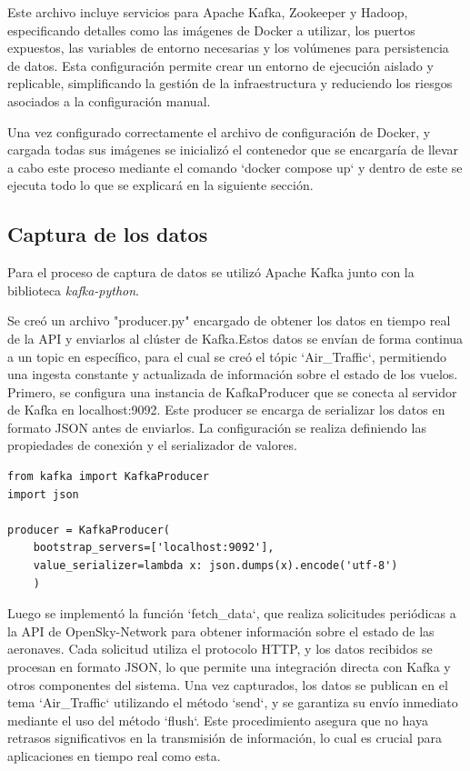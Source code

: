 \documentclass{article}
\begin{document}
Este archivo incluye servicios para Apache Kafka, Zookeeper y Hadoop, especificando detalles como las imágenes de Docker a utilizar, los puertos expuestos, las variables de entorno necesarias y los volúmenes para persistencia de datos. Esta configuración permite crear un entorno de ejecución aislado y replicable, simplificando la gestión de la infraestructura y reduciendo los riesgos asociados a la configuración manual.

Una vez configurado correctamente el archivo de configuración de Docker, y cargada todas sus imágenes se inicializó el contenedor que se encargaría de llevar a cabo este proceso mediante el comando `docker compose up` y dentro de este se ejecuta todo lo que se explicará en la siguiente sección.

\subsection{Captura de los datos}

Para el proceso de captura de datos se utilizó Apache Kafka junto con la biblioteca \textit{kafka-python}.

Se creó un archivo "producer.py" encargado de obtener los datos en tiempo real de la API  y enviarlos al clúster de Kafka.Estos datos se envían de forma continua a un topic en específico, para el cual se creó el tópic `Air\_Traffic`, permitiendo una ingesta constante y actualizada de información sobre el estado de los vuelos.
Primero, se configura una instancia de KafkaProducer que se conecta al servidor de Kafka en localhost:9092. Este producer se encarga de serializar los datos en formato JSON antes de enviarlos. La configuración se realiza definiendo las propiedades de conexión y el serializador de valores.

\begin{lstlisting}[style=python]
from kafka import KafkaProducer
import json

producer = KafkaProducer(
    bootstrap_servers=['localhost:9092'],
    value_serializer=lambda x: json.dumps(x).encode('utf-8')
    )
\end{lstlisting}

Luego se implementó la función `fetch\_data`, que realiza solicitudes periódicas a la API de OpenSky-Network para obtener información sobre el estado de las aeronaves. Cada solicitud utiliza el protocolo HTTP, y los datos recibidos se procesan en formato JSON, lo que permite una integración directa con Kafka y otros componentes del sistema.
Una vez capturados, los datos se publican en el tema `Air\_Traffic` utilizando el método `send`, y se garantiza su envío inmediato mediante el uso del método `flush`. Este procedimiento asegura que no haya retrasos significativos en la transmisión de información, lo cual es crucial para aplicaciones en tiempo real como esta.
\end{document}
